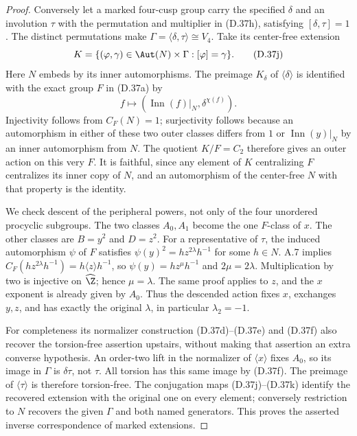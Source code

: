 \begin{proof}
Conversely let a marked four-cusp group carry the specified
$\delta$ and an involution $\tau$ with the permutation and
multiplier in (D.37h), satisfying $[\delta,\tau]=1$.
The distinct permutations make
$\Gamma=\langle\delta,\tau\rangle\cong V_4$.
Take its center-free extension
\[
 K=\{(\varphi,\gamma)\in\Aut(N)\times\Gamma:
                         [\varphi]=\gamma\}.
                                                        \tag{D.37j}
\]
Here $N$ embeds by its inner automorphisms.  The preimage
$K_\delta$ of $\langle\delta\rangle$ is identified with
the exact group $F$ in (D.37a) by
\[
 f\longmapsto
       (\operatorname{Inn}(f)|_N,\delta^{\chi(f)}).
                                                        \tag{D.37k}
\]
Injectivity follows from $C_F(N)=1$; surjectivity follows
because an automorphism in either of these two outer
classes differs from $1$ or $\operatorname{Inn}(y)|_N$
by an inner automorphism from $N$.
The quotient $K/F=C_2$ therefore gives an outer action on
this very $F$.  It is faithful, since any element of $K$
centralizing $F$ centralizes its inner copy of $N$, and
an automorphism of the center-free $N$ with that property
is the identity.

We check descent of the peripheral powers, not only of the
four unordered procyclic subgroups.  The two classes
$A_0,A_1$ become the one $F$-class of $x$.
The other classes are $B=y^2$ and $D=z^2$.
For a representative of $\tau$, the induced automorphism
$\psi$ of $F$ satisfies
$\psi(y)^2=h z^{2\lambda}h^{-1}$ for some $h\in N$.
A.7 implies
$C_F(hz^{2\lambda}h^{-1})=h\langle z\rangle h^{-1}$,
so $\psi(y)=hz^\mu h^{-1}$ and $2\mu=2\lambda$.
Multiplication by two is injective on $\widehat\Z$;
hence $\mu=\lambda$.  The same proof applies to $z$,
and the $x$ exponent is already given by $A_0$.
Thus the descended action fixes $x$, exchanges $y,z$,
and has exactly the original $\lambda$, in particular
$\lambda_2=-1$.

For completeness its normalizer construction (D.37d)--(D.37e)
and (D.37f) also recover the torsion-free assertion upstairs,
without making that assertion an extra converse hypothesis.
An order-two lift in the normalizer of $\langle x\rangle$
fixes $A_0$, so its image in $\Gamma$ is $\delta\tau$,
not $\tau$.  All torsion has this same image by (D.37f).
The preimage of $\langle\tau\rangle$ is therefore torsion-free.
The conjugation maps (D.37j)--(D.37k) identify the recovered
extension with the original one on every element; conversely
restriction to $N$ recovers the given $\Gamma$ and both
named generators.  This proves the asserted inverse
correspondence of marked extensions.


\end{proof}
